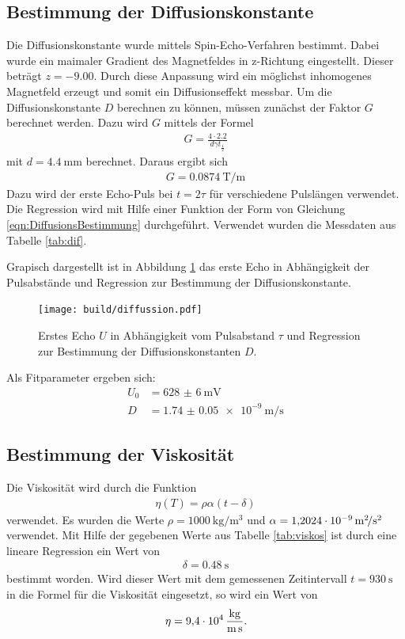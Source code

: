 \subsection{Bestimmung der Diffusionskonstante}
Die Diffusionskonstante wurde mittels Spin-Echo-Verfahren bestimmt. Dabei wurde
ein maimaler Gradient des Magnetfeldes in z-Richtung eingestellt. Dieser beträgt
$z = -\num{9.00}$. Durch diese Anpassung wird ein möglichst inhomogenes Magnetfeld
erzeugt und somit ein Diffusionseffekt messbar.
Um die Diffusionskonstante $D$ berechnen zu können, müssen zunächst der Faktor
$G$ berechnet werden. Dazu wird $G$ mittels der Formel
\begin{align*}
  G = \frac{4\cdot 2.2}{d \gamma t_\frac{1}{2}}
\end{align*}
mit $d = \SI{4.4}{\milli\meter}$ berechnet.
Daraus ergibt sich
\begin{align*}
  G = \SI{0.0874}{\tesla\per\meter}
\end{align*}
Dazu wird der erste Echo-Puls bei $t = 2\tau$ für verschiedene Pulslängen
verwendet. Die Regression wird mit Hilfe
einer Funktion der Form von Gleichung \eqref{eqn:DiffusionsBestimmung} durchgeführt. Verwendet wurden die
Messdaten aus Tabelle \ref{tab:dif}.

Grapisch dargestellt ist in Abbildung
\ref{plt:diff} das erste Echo in Abhängigkeit der Pulsabstände und Regression
zur Bestimmung der Diffusionskonstante.
\begin{figure}[htb]
  \centering
  \texttt{[image: build/diffussion.pdf]}
  \caption{Erstes Echo $U$ in Abhängigkeit vom Pulsabstand $\tau$ und Regression
  zur Bestimmung der Diffusionskonstanten $D$.}
  \label{plt:diff}
\end{figure}

Als Fitparameter ergeben sich:
\begin{align*}
  U_0 &= \SI{628(6)}{\milli\volt} \\
  D &= \SI{1.74(5)e-9}{\meter\per\second}
\end{align*}

\subsection{Bestimmung der Viskosität}
Die Viskosität wird durch die Funktion
\begin{align*}
  \eta(T) = \rho \alpha \left(t - \delta\right)
\end{align*}
verwendet. Es wurden die Werte $\rho = \SI{1000}{\kilo\gram\per\cubic\meter}$
und $\alpha = \SI{1.2024d-9}{\square\meter\per\square\second}$ verwendet. Mit
Hilfe der gegebenen Werte aus Tabelle \ref{tab:viskos} ist durch eine lineare
Regression ein Wert von
\begin{align*}
  \delta = \SI{0.48}{\second}
\end{align*}
bestimmt worden. Wird dieser Wert mit dem gemessenen Zeitintervall
$t = \SI{930}{\second}$ in die Formel für die Viskosität eingesetzt, so wird ein
Wert von
\begin{align*}
  \eta = \SI{9.4d4}{\kilo\gram\per\meter\per\second}.
\end{align*}

